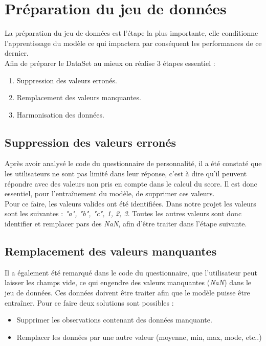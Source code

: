 \documentclass[french]{article}
\begin{document}
\section{Préparation du jeu de données}

La préparation du jeu de données est l'étape la plus importante, elle conditionne l'apprentissage du modèle ce qui impactera par conséquent les performances de ce dernier.\\
\noindent Afin de préparer le DataSet au mieux on réalise 3 étapes essentiel :
\begin{enumerate}
    \item Suppression des valeurs erronés.
    \item Remplacement des valeurs manquantes.
    \item Harmonisation des données.
\end{enumerate}

\subsection{Suppression des valeurs erronés}

Après avoir analysé le code du questionnaire de personnalité, il a été constaté que les utilisateurs ne sont pas limité dans leur réponse, c'est à dire qu'il peuvent répondre avec des valeurs non pris en compte dans le calcul du score. Il est donc essentiel, pour l'entraînement du modèle, de supprimer ces valeurs.\\

\noindent Pour ce faire, les valeurs valides ont été identifiées. Dans notre projet les valeurs sont les suivantes : \textit{"a", "b", "c", 1, 2, 3}. Toutes les autres valeurs sont donc identifier et remplacer pars des \textit{NaN}, afin d'être traiter dans l'étape suivante.

\subsection{Remplacement des valeurs manquantes}

Il a également été remarqué dans le code du questionnaire, que l'utilisateur peut laisser les champs vide, ce qui engendre des valeurs manquantes (\textit{NaN}) dans le jeu de données. Ces données doivent être traiter afin que le modèle puisse être entraîner. Pour ce faire deux solutions sont possibles :

\begin{itemize}
    \item Supprimer les observations contenant des données manquante.
    \item Remplacer les données par une autre valeur (moyenne, min, max, mode, etc..)
\end{itemize}
\end{document}
